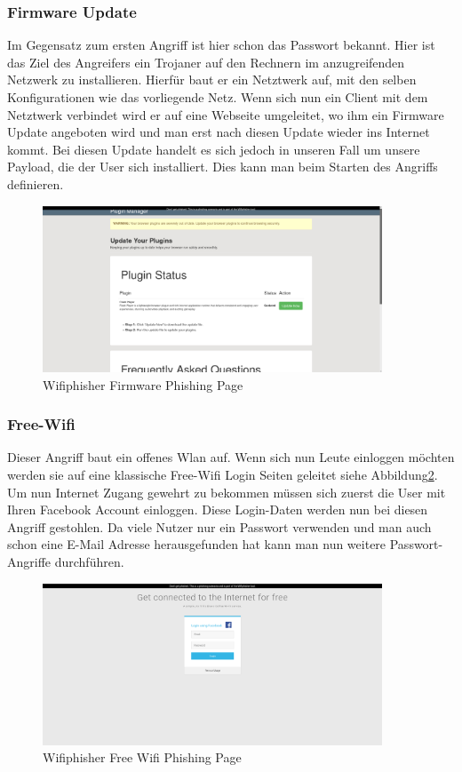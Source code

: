 \subsubsection{Firmware Update}
Im Gegensatz zum ersten Angriff ist hier schon das Passwort bekannt. Hier ist das Ziel des Angreifers ein Trojaner auf den Rechnern im anzugreifenden Netzwerk zu installieren. Hierfür baut er ein Netztwerk auf, mit den selben Konfigurationen wie das vorliegende Netz. Wenn sich nun ein Client mit dem Netztwerk verbindet wird er auf eine Webseite umgeleitet, wo ihm ein Firmware Update angeboten wird und man erst nach diesen Update wieder ins Internet kommt. Bei diesen Update handelt es sich jedoch in unseren Fall um unsere Payload, die der User sich installiert. Dies kann man beim Starten des Angriffs definieren.


\begin{figure}[H]
	\centering
	\includegraphics[width=0.9\textwidth]{images/WLAN/firmewareUpdateWifi}
	\caption{Wifiphisher Firmware Phishing Page}
    \label{fig:wifiFirmwarePage}
\end{figure}

\subsubsection{Free-Wifi}
Dieser Angriff baut ein offenes Wlan auf. Wenn sich nun Leute einloggen möchten werden sie auf eine klassische Free-Wifi Login Seiten geleitet siehe Abbildung\ref{fig:wifiFreePage}. Um nun Internet Zugang gewehrt zu bekommen müssen sich zuerst die User mit Ihren Facebook Account einloggen. Diese Login-Daten werden nun bei diesen Angriff gestohlen. Da viele Nutzer nur ein Passwort verwenden und man auch schon eine E-Mail Adresse herausgefunden hat kann man nun weitere Passwort-Angriffe durchführen.

\begin{figure}[H]
	\centering
	\includegraphics[width=0.9\textwidth]{images/WLAN/freeWifi.png}
	\caption{Wifiphisher Free Wifi Phishing Page}
    \label{fig:wifiFreePage}
\end{figure}

